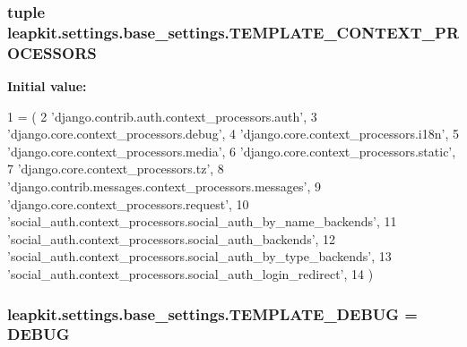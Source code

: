 \hypertarget{namespaceleapkit_1_1settings_1_1base__settings_a25b8c5ac8956aa2e08f6b950f6f85db3}{
\subsubsection[{T\-E\-M\-P\-L\-A\-T\-E\-\_\-\-C\-O\-N\-T\-E\-X\-T\-\_\-\-P\-R\-O\-C\-E\-S\-S\-O\-R\-S}]{\setlength{\rightskip}{0pt plus 5cm}tuple leapkit.\-settings.\-base\-\_\-settings.\-T\-E\-M\-P\-L\-A\-T\-E\-\_\-\-C\-O\-N\-T\-E\-X\-T\-\_\-\-P\-R\-O\-C\-E\-S\-S\-O\-R\-S}}\label{namespaceleapkit_1_1settings_1_1base__settings_a25b8c5ac8956aa2e08f6b950f6f85db3}
{\bfseries Initial value\-:}
\begin{DoxyCode}
1 = (
2     \textcolor{stringliteral}{'django.contrib.auth.context\_processors.auth'},
3     \textcolor{stringliteral}{'django.core.context\_processors.debug'},
4     \textcolor{stringliteral}{'django.core.context\_processors.i18n'},
5     \textcolor{stringliteral}{'django.core.context\_processors.media'},
6     \textcolor{stringliteral}{'django.core.context\_processors.static'},
7     \textcolor{stringliteral}{'django.core.context\_processors.tz'},
8     \textcolor{stringliteral}{'django.contrib.messages.context\_processors.messages'},
9     \textcolor{stringliteral}{'django.core.context\_processors.request'},
10     \textcolor{stringliteral}{'social\_auth.context\_processors.social\_auth\_by\_name\_backends'},
11     \textcolor{stringliteral}{'social\_auth.context\_processors.social\_auth\_backends'},
12     \textcolor{stringliteral}{'social\_auth.context\_processors.social\_auth\_by\_type\_backends'},
13     \textcolor{stringliteral}{'social\_auth.context\_processors.social\_auth\_login\_redirect'},
14 )
\end{DoxyCode}
\hypertarget{namespaceleapkit_1_1settings_1_1base__settings_a605dda137fd70377bc8299aacf600ccb}{
\subsubsection[{T\-E\-M\-P\-L\-A\-T\-E\-\_\-\-D\-E\-B\-U\-G}]{\setlength{\rightskip}{0pt plus 5cm}leapkit.\-settings.\-base\-\_\-settings.\-T\-E\-M\-P\-L\-A\-T\-E\-\_\-\-D\-E\-B\-U\-G = {\bf D\-E\-B\-U\-G}}}\label{namespaceleapkit_1_1settings_1_1base__settings_a605dda137fd70377bc8299aacf600ccb}
